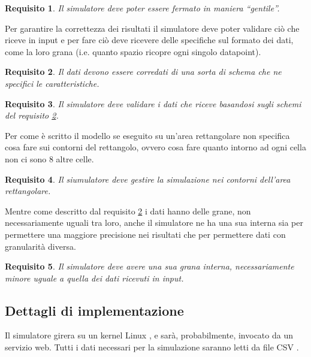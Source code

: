 \documentclass[draft]{article}
\newcommand{\eng}[1]{\foreignlanguage{english}{#1}} %
\newtheorem{requirement}{Requisito}
\begin{document}
\begin{requirement}\label{thm:termination}
Il simulatore deve poter essere fermato in maniera ``gentile''.
\end{requirement}

Per garantire la correttezza dei risultati il simulatore deve poter validare
ciò che riceve in \eng{input} e per fare ciò deve ricevere delle specifiche sul
formato dei dati, come la loro grana (i.e. quanto spazio ricopre ogni singolo
\eng{datapoint}).

\begin{requirement}\label{thm:schema}
Il dati devono essere corredati di una sorta di schema che ne specifici le
caratteristiche.
\end{requirement}

\begin{requirement}
Il simulatore deve validare i dati che riceve basandosi sugli schemi del
requisito \ref{thm:schema}.
\end{requirement}

Per come è scritto il modello se eseguito su un'area rettangolare non specifica
cosa fare sui contorni del rettangolo, ovvero cosa fare quanto intorno ad ogni
cella non ci sono 8 altre celle.

\begin{requirement}\label{thm:boundary}
Il siumulatore deve gestire la simulazione nei contorni dell'area rettangolare.
\end{requirement}

Mentre come descritto dal requisito \ref{thm:schema} i dati hanno delle grane,
non necessariamente uguali tra loro, anche il simulatore ne ha una sua interna
sia per permettere una maggiore precisione nei risultati che per permettere dati
con granularità diversa.

\begin{requirement}\label{thm:grain}
Il simulatore deve avere una sua grana interna, necessariamente minore uguale a
quella dei dati ricevuti in \eng{input}.
\end{requirement}

\subsection{Dettagli di implementazione}\label{sec:implementation}

Il simulatore girera su un \eng{kernel} Linux \cite{kern}, e sarà,
probabilmente, invocato da un servizio \eng{web}. Tutti i dati necessari per la
simulazione saranno letti da \eng{file} CSV \cite{csv}.
\end{document}
